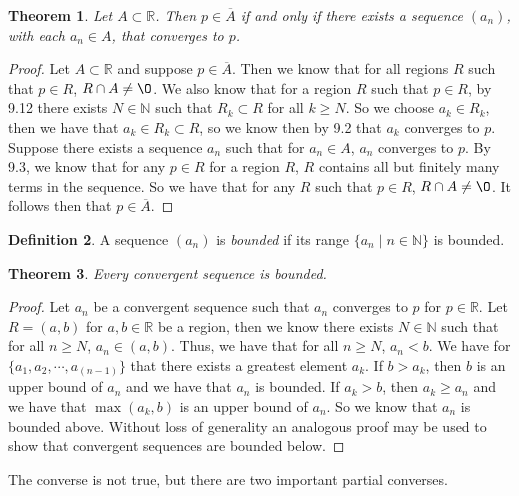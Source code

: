 \documentclass[12pt]{article}
\newcommand{\bbN}{\mathbb{N}}
\newcommand{\bbR}{\mathbb{R}}
\renewcommand{\emptyset}{\O}
\renewcommand{\_}[1]{\underline{ #1 }}
\newtheorem{theorem}{Theorem}[section]
\theoremstyle{definition}
\newtheorem{definition}[theorem]{Definition}
\numberwithin{equation}{subsection}
\begin{document}
\begin{theorem}  Let $A \subset \bbR$.  Then $p \in \overline{A}$ if and only if there exists a sequence $(a_n)$, with each $a_n \in A$, that converges to $p$.
\end{theorem}

\begin{proof} 
Let $A \subset \bbR$ and suppose $p \in \overline{A}$. Then we know that for all regions $R$ such that $p \in R$, $R \cap A \not = \emptyset$. We also know that for a region $R$ such that $p \in R$, by 9.12 there exists $N \in \bbN$ such that $R_k \subset R$ for all $k \geq N$. So we choose $a_k \in R_k$, then we have that $a_k \in R_k \subset R$, so we know then by 9.2 that $a_k$ converges to $p$. \newline
Suppose there exists a sequence $a_n$ such that for $a_n \in A$, $a_n$ converges to $p$. By 9.3, we know that for any $p \in R$ for a region $R$, $R$ contains all but finitely many terms in the sequence. So we have that for any $R$ such that $p \in R$, $R \cap A \not = \emptyset$. It follows then that $p \in \overline{A}$.
\end{proof}

\begin{definition}  A sequence $(a_n)$ is \emph{bounded} if its range $\{a_n\mid n\in\bbN\}$ is bounded.
\end{definition}

\begin{theorem}  Every convergent sequence is bounded.
\end{theorem}

\begin{proof}
Let $a_n$ be a convergent sequence such that $a_n$ converges to $p$ for $p \in \bbR$. Let $R = (a,b)$ for $a,b \in \bbR$ be a region, then we know there exists $N \in \bbN$ such that for all $n \geq N$, $a_n \in (a,b)$. Thus, we have that for all $n \geq N$, $a_n < b$. We have for $\{a_1, a_2, \dotsm, a_(n-1)\}$ that there exists a greatest element $a_k$. If $b > a_k$, then $b$ is an upper bound of $a_n$ and we have that $a_n$ is bounded. If $a_k > b$, then $a_k \geq a_n$ and we have that $\max(a_k, b)$ is an upper bound of $a_n$. So we know that $a_n$ is bounded above. Without loss of generality an analogous proof may be used to show that convergent sequences are bounded below.
\end{proof}

The converse is not true, but there are two important partial converses.
\end{document}
